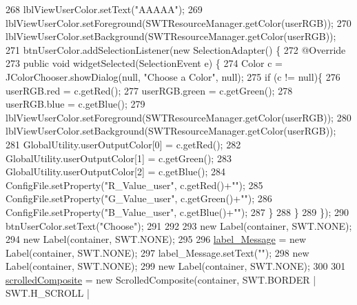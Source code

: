 \begin{DoxyCode}
268         lblViewUserColor.setText(\textcolor{stringliteral}{"AAAAA"});
269         lblViewUserColor.setForeground(SWTResourceManager.getColor(userRGB));
270         lblViewUserColor.setBackground(SWTResourceManager.getColor(userRGB));
271         btnUserColor.addSelectionListener(\textcolor{keyword}{new} SelectionAdapter() \{
272             @Override
273             \textcolor{keyword}{public} \textcolor{keywordtype}{void} widgetSelected(SelectionEvent e) \{
274                 Color c = JColorChooser.showDialog(null, \textcolor{stringliteral}{"Choose a Color"}, null);
275                   \textcolor{keywordflow}{if} (c != null)\{
276                       userRGB.red = c.getRed();
277                       userRGB.green = c.getGreen();
278                       userRGB.blue = c.getBlue();
279                       lblViewUserColor.setForeground(SWTResourceManager.getColor(userRGB));
280                       lblViewUserColor.setBackground(SWTResourceManager.getColor(userRGB));
281                       GlobalUtility.userOutputColor[0] = c.getRed();
282                       GlobalUtility.userOutputColor[1] = c.getGreen();
283                       GlobalUtility.userOutputColor[2] = c.getBlue();
284                       ConfigFile.setProperty(\textcolor{stringliteral}{"R\_Value\_user"}, c.getRed()+\textcolor{stringliteral}{""});
285                       ConfigFile.setProperty(\textcolor{stringliteral}{"G\_Value\_user"}, c.getGreen()+\textcolor{stringliteral}{""});
286                       ConfigFile.setProperty(\textcolor{stringliteral}{"B\_Value\_user"}, c.getBlue()+\textcolor{stringliteral}{""});
287                   \}
288             \}
289         \});
290         btnUserColor.setText(\textcolor{stringliteral}{"Choose"});
291         
292         
293         \textcolor{keyword}{new} Label(container, SWT.NONE);
294         \textcolor{keyword}{new} Label(container, SWT.NONE);
295         
296         \hyperlink{classit_1_1isislab_1_1masonassisteddocumentation_1_1mason_1_1wizards_1_1_b___project_information_page_a08c0494b74656d068e78bbe0a56715ed}{label\_Message} = \textcolor{keyword}{new} Label(container, SWT.NONE);
297         label\_Message.setText(\textcolor{stringliteral}{""});
298         \textcolor{keyword}{new} Label(container, SWT.NONE);
299         \textcolor{keyword}{new} Label(container, SWT.NONE);
300         
301         \hyperlink{classit_1_1isislab_1_1masonassisteddocumentation_1_1mason_1_1wizards_1_1_b___project_information_page_adf33db8f408e4f486a256d199eae3bae}{scrolledComposite} = \textcolor{keyword}{new} ScrolledComposite(container, SWT.BORDER | SWT.H\_SCROLL | 

\end{DoxyCode}
